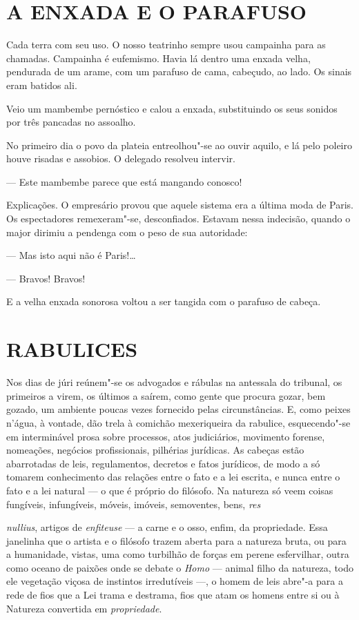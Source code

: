 \section*{A ENXADA E O PARAFUSO}

Cada terra com seu uso. O nosso teatrinho sempre usou campainha para as
chamadas. Campainha é eufemismo. Havia lá dentro uma enxada velha,
pendurada de um arame, com um parafuso de cama, cabeçudo, ao lado. Os
sinais eram batidos ali.

Veio um mambembe pernóstico e calou a enxada, substituindo os seus
sonidos por três pancadas no assoalho.

No primeiro dia o povo da plateia entreolhou"-se ao ouvir aquilo, e lá
pelo poleiro houve risadas e assobios. O delegado resolveu intervir.

--- Este mambembe parece que está mangando conosco!

Explicações. O empresário provou que aquele sistema era a última moda de
Paris. Os espectadores remexeram"-se, desconfiados. Estavam nessa
indecisão, quando o major dirimiu a pendenga com o peso de sua
autoridade:

--- Mas isto aqui não é Paris!\ldots{}

--- Bravos! Bravos!

E a velha enxada sonorosa voltou a ser tangida com o parafuso de cabeça.

\section*{RABULICES}

Nos dias de júri reúnem"-se os advogados e rábulas na antessala do
tribunal, os primeiros a virem, os últimos a saírem, como gente que
procura gozar, bem gozado, um ambiente poucas vezes fornecido pelas
circunstâncias. E, como peixes n'água, à vontade, dão trela à comichão
mexeriqueira da rabulice, esquecendo"-se em interminável prosa sobre
processos, atos judiciários, movimento forense, nomeações, negócios
profissionais, pilhérias jurídicas. As cabeças estão abarrotadas de
leis, regulamentos, decretos e fatos jurídicos, de modo a só tomarem
conhecimento das relações entre o fato e a lei escrita, e nunca entre o
fato e a lei natural --- o que é próprio do filósofo. Na natureza só
veem coisas fungíveis, infungíveis, móveis, imóveis, semoventes, bens,
\emph{res}

\emph{nullius}, artigos de \emph{enfiteuse} --- a carne e o osso, enfim,
da propriedade. Essa janelinha que o artista e o filósofo trazem aberta
para a natureza bruta, ou para a humanidade, vistas, uma como turbilhão
de forças em perene esfervilhar, outra como oceano de paixões onde se
debate o \emph{Homo} --- animal filho da natureza, todo ele vegetação
viçosa de instintos irredutíveis ---, o homem de leis abre"-a para a rede
de fios que a Lei trama e destrama, fios que atam os homens entre si ou
à Natureza convertida em \emph{propriedade}.

